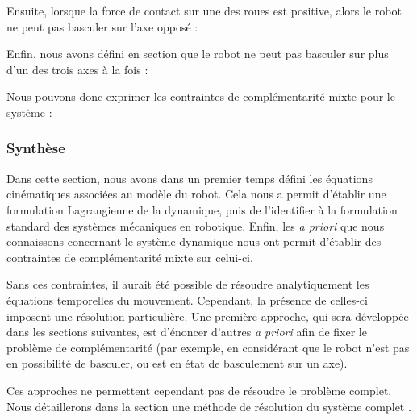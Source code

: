				Ensuite, lorsque la force de contact sur une des roues est positive, alors le robot ne peut pas basculer sur l'axe opposé :
				
				Enfin, nous avons défini en section  que le robot ne peut pas basculer sur plus d'un des trois axes à la fois :
				
				Nous pouvons donc exprimer les contraintes de complémentarité mixte pour le système :
				
			\subsubsection{Synthèse}
			
				Dans cette section, nous avons dans un premier temps défini les équations cinématiques associées au modèle du robot.
				Cela nous a permit d'établir une formulation Lagrangienne de la dynamique, puis de l'identifier à la formulation standard des systèmes mécaniques en robotique.
				Enfin, les \textit{a priori} que nous connaissons concernant le système dynamique nous ont permit d'établir des contraintes de complémentarité mixte sur celui-ci.
				
				
				
				Sans ces contraintes, il aurait été possible de résoudre analytiquement les équations temporelles du mouvement. Cependant, la présence de celles-ci imposent une résolution particulière.
				Une première approche, qui sera développée dans les sections suivantes, est d'énoncer d'autres \textit{a priori} afin de fixer le problème de complémentarité
				(par exemple, en considérant que le robot n'est pas en possibilité de basculer, ou est en état de basculement sur un axe). 
				
				Ces approches ne permettent cependant pas de résoudre le problème complet. 
				Nous détaillerons dans la section  une méthode de résolution du système complet .
		
